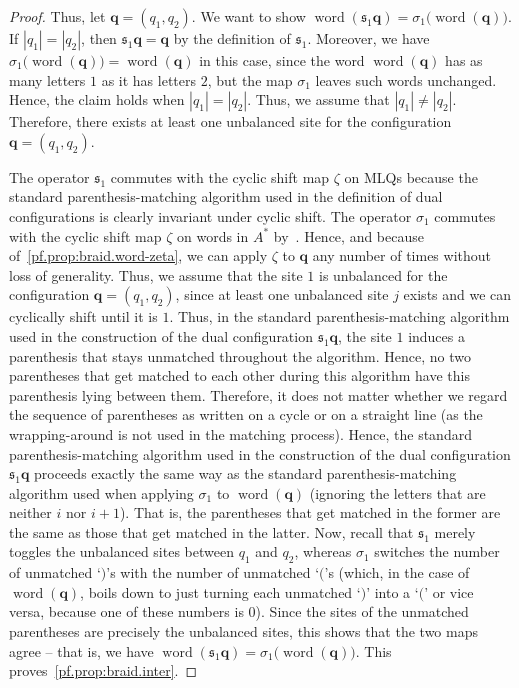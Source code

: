 \documentclass[reqno]{amsart}
\newcommand{\0}{\phantom{c}}
\DeclareMathOperator{\inter}{int} %
\DeclareMathOperator{\word}{word} %
\newcommand{\qq}{\mathbf{q}}
\newcommand{\fraks}{\mathfrak{s}}
\newcommand{\abs}[1]{\left| #1 \right|}
\theoremstyle{plain}
\theoremstyle{definition}
\numberwithin{equation}{section}
\begin{document}
\begin{proof}
Thus, let $\qq = (q_1, q_2)$.
We want to show $\word(\fraks_1 \qq) = \sigma_1\bigl( \word(\qq) \bigr)$.
If $\abs{q_1} = \abs{q_2}$, then $\fraks_1 \qq = \qq$ by the definition of $\fraks_1$.
Moreover, we have $\sigma_1\bigl( \word(\qq) \bigr) = \word(\qq)$ in this case, since the word $\word(\qq)$ has as many letters $1$ as it has letters $2$, but the map $\sigma_1$ leaves such words unchanged.
Hence, the claim holds when $\abs{q_1} = \abs{q_2}$.
Thus, we assume that $\abs{q_1} \neq \abs{q_2}$.
Therefore, there exists at least one unbalanced site for the configuration $\qq = (q_1, q_2)$.

The operator $\fraks_1$ commutes with the cyclic shift map $\zeta$ on MLQs because the standard parenthesis-matching algorithm used in the definition of dual configurations is clearly invariant under cyclic shift.
The operator $\sigma_1$ commutes with the cyclic shift map $\zeta$ on words in $A^*$ by~\cite[Prop.~5.6.1]{Loth}.
Hence, and because of~\eqref{pf.prop:braid.word-zeta}, we can apply $\zeta$ to $\qq$ any number of times without loss of generality.
Thus, we assume that the site $1$ is unbalanced for the configuration $\qq = (q_1, q_2)$, since at least one unbalanced site $j$ exists and we can cyclically shift until it is $1$.
Thus, in the standard parenthesis-matching algorithm used in the construction of the dual configuration $\fraks_1 \qq$, the site $1$ induces a parenthesis that stays unmatched throughout the algorithm.
Hence, no two parentheses that get matched to each other during this algorithm have this parenthesis lying between them.
Therefore, it does not matter whether we regard the sequence of parentheses as written on a cycle or on a straight line (as the wrapping-around is not used in the matching process).
Hence, the standard parenthesis-matching algorithm used in the construction of the dual configuration $\fraks_1 \qq$ proceeds exactly the same way as the standard parenthesis-matching algorithm used when applying $\sigma_1$ to $\word(\qq)$ (ignoring the letters that are neither $i$ nor $i+1$). That is, the parentheses that get matched in the former are the same as those that get matched in the latter.
Now, recall that $\fraks_1$ merely toggles the unbalanced sites between $q_1$ and $q_2$, whereas $\sigma_1$ switches the number of unmatched `$)$'s with the number of unmatched `$($'s (which, in the case of $\word(\qq)$, boils down to just turning each unmatched `$)$' into a `$($' or vice versa, because one of these numbers is $0$).
Since the sites of the unmatched parentheses are precisely the unbalanced sites, this shows that the two maps agree -- that is, we have $\word(\fraks_1 \qq) = \sigma_1\bigl( \word(\qq) \bigr)$.
This proves~\eqref{pf.prop:braid.inter}.


\end{proof}
\end{document}
